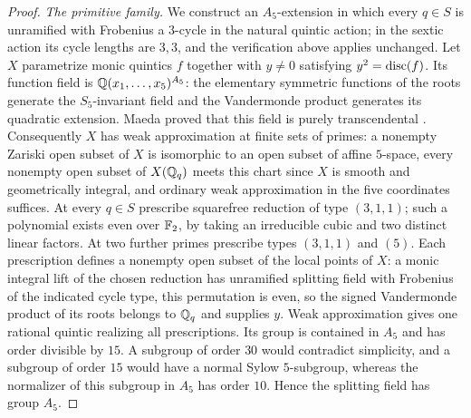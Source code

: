 \begin{proof}
\emph{The primitive family.} We construct an $A_5$-extension in which every $q\in S$ is
unramified with Frobenius a $3$-cycle in the natural quintic action; in the sextic
action its cycle lengths are $3,3$, and the verification above applies unchanged. Let
$X$ parametrize monic quintics $f$ together with $y\ne0$ satisfying $y^2=\operatorname{disc}(f)$. Its
function field is $\mathbb{Q}(x_1,\dots,x_5)^{A_5}$: the elementary symmetric functions of the
roots generate the $S_5$-invariant field and the Vandermonde product generates its
quadratic extension. Maeda proved that this field is purely transcendental
\cite{Maeda1989Noether}. Consequently $X$ has weak approximation at finite sets of
primes: a nonempty Zariski open subset of $X$ is isomorphic to an open subset of affine
$5$-space, every nonempty open subset of $X(\mathbb{Q}_q)$ meets this chart since $X$ is smooth
and geometrically integral, and ordinary weak approximation in the five coordinates
suffices. At every $q\in S$ prescribe squarefree reduction of type $(3,1,1)$; such a
polynomial exists even over $\mathbb{F}_2$, by taking an irreducible cubic and two distinct
linear factors. At two further primes prescribe types $(3,1,1)$ and $(5)$. Each
prescription defines a nonempty open subset of the local points of $X$: a monic
integral lift of the chosen reduction has unramified splitting field with Frobenius of
the indicated cycle type, this permutation is even, so the signed Vandermonde product
of its roots belongs to $\mathbb{Q}_q$ and supplies $y$. Weak approximation gives one rational
quintic realizing all prescriptions. Its group is contained in $A_5$ and has order
divisible by $15$. A subgroup of order $30$ would contradict simplicity, and a subgroup
of order $15$ would have a normal Sylow $5$-subgroup, whereas the normalizer of this
subgroup in $A_5$ has order $10$. Hence the splitting field has group $A_5$.
\end{proof}

